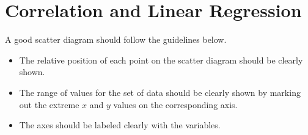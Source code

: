 \documentclass[../Notes.tex]{subfiles}
\begin{document}
\chapter{Correlation and Linear Regression}
\begin{note}
  A good scatter diagram should follow the guidelines below.
  \begin{itemize}
    \item The relative position of each point on the scatter diagram should be clearly shown.
    \item The range of values for the set of data should be clearly shown by marking out the extreme \(x\) and \(y\) values on the corresponding axis.
    \item The axes should be labeled clearly with the variables.
  \end{itemize}
\end{note}
\end{document}

